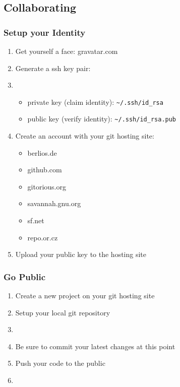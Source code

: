 %
%
%
%

\subsection{Collaborating}

\begin{slide}[fragile]
  \frametitle{Setup your Identity}
  \begin{enumerate}
    \item Get yourself a face: gravatar.com
    \item Generate a ssh key pair:
    \item[]
    \begin{itemize}
      \item private key (claim identity): \verb+~/.ssh/id_rsa+
      \item public key (verify identity): \verb+~/.ssh/id_rsa.pub+
    \end{itemize}
    \item Create an account with your git hosting site:
      \begin{itemize}
        \item berlios.de
        \item github.com
        \item gitorious.org
        \item savannah.gnu.org
        \item sf.net
        \item repo.or.cz
      \end{itemize}
    \item Upload your public key to the hosting site
  \end{enumerate}
\end{slide}

\begin{slide}[fragile]
  \frametitle{Go Public}
  \begin{enumerate}
    \item Create a new project on your git hosting site
    \item Setup your local git repository
    \item[]
    \item Be sure to commit your latest changes at this point
    \item Push your code to the public
    \item[]
  \end{enumerate}
\end{slide}

